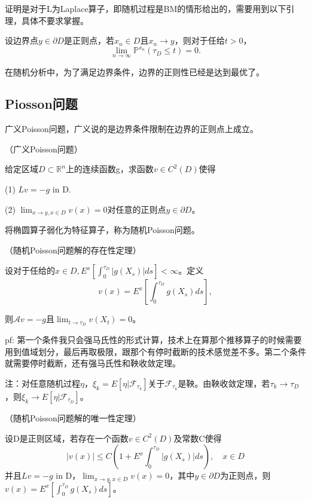 证明是对于L为Laplace算子，即随机过程是BM的情形给出的，需要用到以下引理，具体不要求掌握。

\begin{lem}
  设边界点$y \in \partial D$是正则点，若$x_{n} \in D$且$x_{n} \rightarrow y$，则对于任给$t>0$，
  \[
    \lim _{n \rightarrow \infty} \mathbb{P}^{x_{n}}\left(\tau_{D} \leq t\right)=0 .
  \]
\end{lem}

在随机分析中，为了满足边界条件，边界的正则性已经是达到最优了。

\subsection{Piosson问题}

广义Poisson问题，广义说的是边界条件限制在边界的正则点上成立。

\begin{df}（广义Poisson问题）
  
  给定区域$D \subset \mathbb{R}^{n}$上的连续函数g，求函数$v \in C^{2}(D)$使得
  
  (1) $L v= -g$ in D.
  
  (2) $\lim_{x \rightarrow y, x \in D} v(x)=0$对任意的正则点$y \in \partial D$。
\end{df}

将椭圆算子弱化为特征算子，称为随机Poisson问题。

\begin{thm}（随机Poisson问题解的存在性定理）
  
  设对于任给的$x \in D, E^{x}\left[\int_{0}^{\tau_{D}}|g\left(X_{s}\right)| d s\right] < \infty$。定义
  \[
    v(x)=E^{x}\left[\int_{0}^{\tau_{D}} g\left(X_{s}\right) d s\right],
  \]

  则$\mathcal{A} v=-g$且$\lim _{t \rightarrow \tau_{D}} v\left(X_{t}\right)=0$。
\end{thm}

pf: 第一个条件我只会强马氏性的形式计算，技术上在算那个推移算子的时候需要用到值域划分，最后再取极限，跟那个有停时截断的技术感觉差不多。第二个条件就需要停时截断，还有强马氏性和鞅收敛定理。

注：对任意随机过程$\eta$，$\xi_k = E[\eta | \mathcal{F}_{\tau_k}]$关于$\mathcal{F}_{\tau_k}$是鞅。由鞅收敛定理，若$\tau_k \to \tau_D$，则$\xi_k \to E[\eta | \mathcal{F}_{\tau_D}]$。

\begin{thm}（随机Poisson问题解的唯一性定理）
  
  设D是正则区域，若存在一个函数$v \in C^{2}(D)$及常数C使得
  \[
    |v(x)| \leq C\left(1+E^{x} \int_{0}^{\tau_{D}}|g\left(X_{s}\right)| d s\right), \quad x \in D
  \]
  并且$L v=-g$ in D，$\lim _{x \rightarrow y, x \in D} v(x)=0$，其中$y \in \partial D$为正则点，则$v(x)=E^{x}[\int_{0}^{\tau_{D}} g\left(X_{s}\right) d s]$。
\end{thm}

